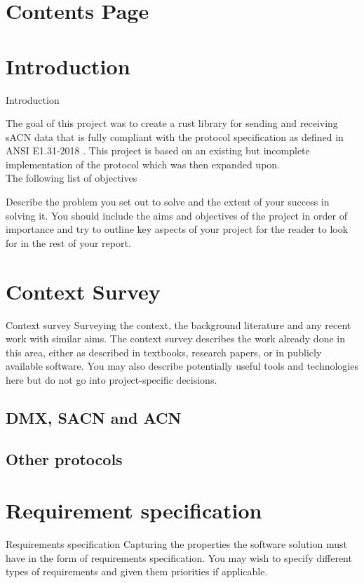 \documentclass[11pt,a4paper,notitlepage]{report}
\begin{document}
	\section{Contents Page}
	\tableofcontents
	
	\section{Introduction}
		Introduction
		
	The goal of this project was to create a rust library for sending and receiving sACN data that is fully compliant with the protocol specification as defined in ANSI E1.31-2018 \cite{ANSI_E1.31}. This project is based on an existing but incomplete implementation of the protocol \cite{ORIGNIAL_IMPL} which was then expanded upon.\\
	
	The following list of objectives
	\begin{list}{}{}
		\item
	\end{list}
	
	Describe the problem you set out to solve and the
	extent of your success in solving it. You should include
	the aims and objectives of the project in order of
	importance and try to outline key aspects of your
	project for the reader to look for in the rest of your
	report.
	
	\section{Context Survey}
	Context survey
	Surveying the context, the background literature and
	any recent work with similar aims. The context survey
	describes the work already done in this area, either as
	described in textbooks, research papers, or in publicly
	available software. You may also describe potentially
	useful tools and technologies here but do not go into
	project-specific decisions.
	\subsection{DMX, SACN and ACN}
	\subsection{Other protocols}
	
	\section{Requirement specification}
	Requirements
	specification
	Capturing the properties the software solution must
	have in the form of requirements specification. You
	may wish to specify different types of requirements and
	given them priorities if applicable.
	
\end{document}
